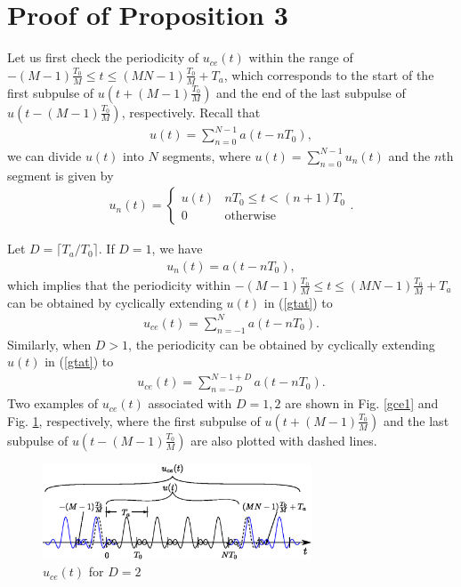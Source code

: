 \documentclass[journal]{IEEEtran}
\begin{document}
{\section{Proof of Proposition 3}
Let us first check the periodicity of $u_{ce}(t)$ within the range of $-(M-1)\frac{T_0}{M}\le t \le (MN-1)\frac{T_0}{M}+T_a$, which corresponds to the start of the first subpulse of $u(t+(M-1)\frac{T_0}{M})$ and the end of the last subpulse of $u(t-(M-1)\frac{T_0}{M})$, respectively. Recall that
\begin{align}\label{gtat}
  u(t)=\sum_{n=0}^{N-1} a(t-nT_0),
\end{align}
we can divide $u(t)$ into $N$ segments, where $u(t) = \sum_{n=0}^{N-1}u_n(t)$ and the $n$th segment is given by
\begin{align}
  u_n(t)  =
  \begin{cases}
    u(t) & nT_0 \le t < (n+1)T_0 \\
    0    & \textrm{otherwise}
  \end{cases}.
\end{align}


Let $D=\lceil T_a/T_0 \rceil$. If $D=1$, we have
\begin{align}
  u_n(t)= a(t-nT_0),
\end{align}
which implies that the periodicity within $-(M-1)\frac{T_0}{M}\le t \le (MN-1)\frac{T_0}{M}+T_a$ can be obtained by cyclically extending $u(t)$ in (\ref{gtat}) to
\begin{align}
  u_{ce}(t)=\sum_{n=-1}^{N} a(t-nT_0).
\end{align}
Similarly, when $D>1$, the periodicity can be obtained by cyclically extending $u(t)$ in (\ref{gtat}) to
\begin{align}\label{ncpcs}
  u_{ce}(t)=\sum_{n=-D}^{N-1+D} a(t-nT_0).
\end{align}
Two examples of $u_{ce}(t)$ associated with $D=1,2$ are shown in Fig. \ref{gce1} and Fig. \ref{gce2}, respectively, where the first subpulse of $u(t+(M-1)\frac{T_0}{M})$ and the last subpulse of $u(t-(M-1)\frac{T_0}{M})$ are also plotted with dashed lines.




\begin{figure}
  \centering
  \includegraphics[width=8cm]{uce22}
  \caption{$u_{ce}(t)$ for $D=2$}
  \label{gce2}
\end{figure}


}
\end{document}
